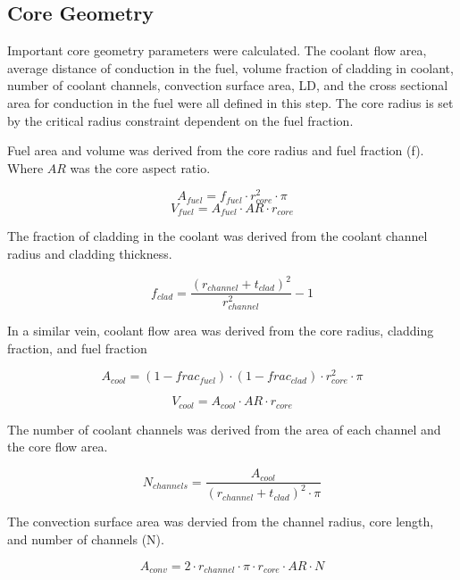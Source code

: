 \subsection{Core Geometry}
Important core geometry parameters were calculated. The coolant flow area,
average distance of conduction in the fuel, volume fraction of cladding in
coolant, number of coolant channels, convection surface area, LD, and the cross
sectional area for conduction in the fuel were all defined in this step. The
core radius is set by the critical
radius constraint dependent on the fuel fraction.

Fuel area and volume was derived from the core radius and fuel fraction (f). Where
$AR$ was the core aspect ratio.

\begin{equation}
    A_{fuel} = f_{fuel}\cdot r_{core}^2 \cdot \pi
\end{equation}
\begin{equation}
    V_{fuel} = A_{fuel}\cdot AR\cdot r_{core}
\end{equation}

The fraction of cladding in the coolant was derived from the coolant channel
radius and cladding thickness.

\begin{equation}
    f_{clad} = \frac{(r_{channel} + t_{clad})^2}{r_{channel}^2} - 1 
\end{equation}

In a similar vein, coolant flow area was derived from the core radius, cladding
fraction, and fuel fraction

\begin{equation}
    A_{cool} = (1-frac_{fuel})\cdot (1-frac_{clad}) \cdot r_{core}^2 \cdot \pi
\end{equation}

\begin{equation}
    V_{cool} = A_{cool}\cdot AR\cdot r_{core}
\end{equation}

The number of coolant channels was derived from the area of each channel and the
core flow area.

\begin{equation}
    N_{channels} = \frac{A_{cool}}{(r_{channel} + t_{clad})^2 \cdot \pi}
\end{equation}

The convection surface area was dervied from the channel radius, core length, and
number of channels (N).

\begin{equation}
    A_{conv} = 2\cdot r_{channel}\cdot \pi\cdot r_{core}\cdot AR\cdot N
\end{equation}

